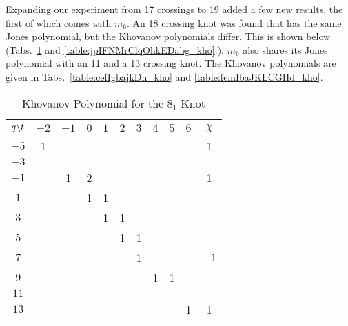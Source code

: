 \documentclass{article}
\theoremstyle{plain}
\begin{document}
        Expanding our experiment from 17 crossings to 19 added a few new
        results, the first of which comes with
        $m_{6}$. An 18 crossing knot was found
        that has the same Jones polynomial, but the Khovanov polynomials
        differ. This is shown below
        (Tabs.~\ref{table:m_6_kho} and \ref{table:jpIFNMrClqOhkEDabg_kho}.).
        $m_{6}$ also shares its Jones polynomial with an 11 and a 13 crossing
        knot. The Khovanov polynomials are given in
        Tabs.~\ref{table:cefIgbajkDh_kho} and
        \ref{table:femIbaJKLCGHd_kho}.
        \begin{table}[H]
            \centering
            \begin{tabular}{| c | c | c | c | c | c | c | c | c | c | c |}
                \hline
                $q\symbol{92}t$&$-2$&$-1$&$0$&$1$&$2$&$3$&$4$&$5$&$6$&$\chi$\\
                \hline
                $-5$&1&&&&&&&&&1\\
                \hline
                $-3$&&&&&&&&&&\\
                \hline
                $-1$&&1&2&&&&&&&1\\
                \hline
                $1$&&&1&1&&&&&&\\
                \hline
                $3$&&&&1&1&&&&&\\
                \hline
                $5$&&&&&1&1&&&&\\
                \hline
                $7$&&&&&&1&&&&$-1$\\
                \hline
                $9$&&&&&&&1&1&&\\
                \hline
                $11$&&&&&&&&&&\\
                \hline
                $13$&&&&&&&&&1&1\\
                \hline
            \end{tabular}
            \caption{Khovanov Polynomial for the $8_{1}$ Knot}
            \label{table:m_6_kho}
        \end{table}
\end{document}
